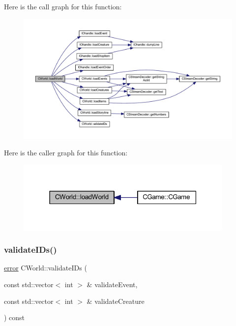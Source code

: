 Here is the call graph for this function\+:\nopagebreak
\begin{figure}[H]
\begin{center}
\leavevmode
\includegraphics[width=350pt]{class_c_world_a944f12acb1ff76beed2648647ff19d0f_cgraph}
\end{center}
\end{figure}
Here is the caller graph for this function\+:\nopagebreak
\begin{figure}[H]
\begin{center}
\leavevmode
\includegraphics[width=303pt]{class_c_world_a944f12acb1ff76beed2648647ff19d0f_icgraph}
\end{center}
\end{figure}
\mbox{\label{class_c_world_a5220755d94cacc872e0f5ae0e7e55eb6}} 
\subsubsection{\texorpdfstring{validate\+I\+Ds()}{validateIDs()}}
{\footnotesize\ttfamily \mbox{\hyperlink{_errors_list_8h_af10dacfa214e2575bb2e0ee407c242e0}{error}} C\+World\+::validate\+I\+Ds (\begin{DoxyParamCaption}\item[{const std\+::vector$<$ int $>$ \&}]{validate\+Event,  }\item[{const std\+::vector$<$ int $>$ \&}]{validate\+Creature }\end{DoxyParamCaption}) const\hspace{0.3cm}{\ttfamily [protected]}}

